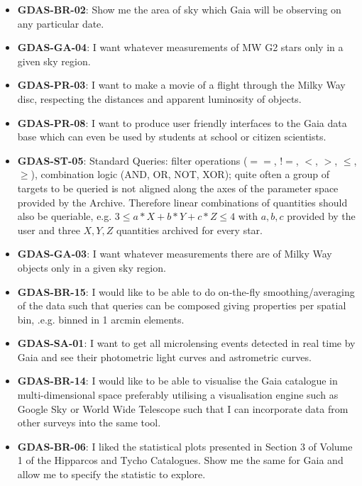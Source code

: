 \documentclass[longauth, final]{aa}
\begin{document}
\begin{itemize}
\item{\bf GDAS-BR-02}: Show me the area of sky which Gaia will be observing on any particular date.

\item{\bf GDAS-GA-04}: I want whatever measurements of MW G2 stars only in a given sky region.

\item{\bf GDAS-PR-03}:  I want to make a movie of a flight through the Milky Way disc, respecting the distances and apparent luminosity of objects.

\item{\bf GDAS-PR-08}:  I want to produce user friendly interfaces to the Gaia data base which can even be used by students at school or citizen scientists.

\item{\bf GDAS-ST-05}: Standard Queries: filter operations ($==$, $!=$, $<$, $>$, $\le$, $\ge$), combination logic (AND, OR, NOT, XOR); quite often a group of targets to be queried is not aligned along the axes of the parameter space provided by the Archive. Therefore  linear combinations of quantities should also be queriable, e.g. $3 \le a*X + b*Y + c*Z \le 4$ with $a, b, c$ provided by the user and three $X, Y, Z$ quantities archived for every star. 

\item{\bf GDAS-GA-03}: I want whatever measurements there are of Milky Way objects only in a given sky region.

\item{\bf GDAS-BR-15}: I would like to be able to do on-the-fly smoothing/averaging of the data such that queries can be composed giving properties per spatial bin, .e.g.  binned in 1 arcmin elements.

\item{\bf GDAS-SA-01}: I want to get all microlensing events detected in real time by Gaia and see their photometric light curves and astrometric curves.

\item{\bf GDAS-BR-14}: I would like to be able to visualise the Gaia catalogue in multi-dimensional space preferably utilising a visualisation engine such as Google Sky or World Wide Telescope such that I can incorporate data from other surveys into the same tool. 

\item{\bf GDAS-BR-06}: I liked the statistical plots presented in Section 3 of Volume 1 of the Hipparcos and Tycho Catalogues. Show me the same for Gaia and allow me to specify the statistic to explore. 


\end{itemize}
\end{document}

